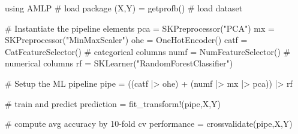 using AMLP           # load package
(X,Y) = getprofb()   # load dataset

# Instantiate the pipeline elements
pca  = SKPreprocessor("PCA") 
mx   = SKPreprocessor("MinMaxScaler")  
ohe  = OneHotEncoder()
catf = CatFeatureSelector()  # categorical columns
numf = NumFeatureSelector()  # numerical columns
rf   = SKLearner("RandomForestClassifier")

# Setup the ML pipeline 
pipe = ((catf |> ohe) + (numf |> mx |> pca)) |> rf

# train and predict
prediction = fit_transform!(pipe,X,Y) 
 
# compute avg accuracy by 10-fold cv
performance = crossvalidate(pipe,X,Y)  
